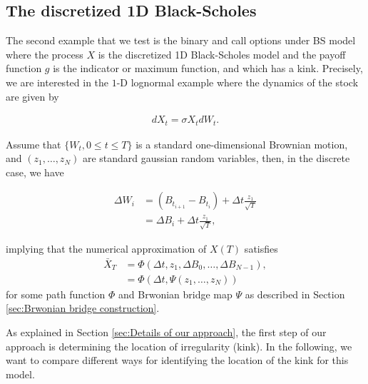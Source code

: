 \documentclass[11pt]{article}
\begin{document}
\FloatBarrier


\subsection{The discretized 1D Black-Scholes}\label{sec:The discretized 1D Black-Scholes}

The second example that we test is the binary and  call options under BS model where the process $X$ is the discretized 1D Black-Scholes model and the payoff function $g$ is the indicator or maximum function, and which has a kink. Precisely, we are interested in the  $1$-D lognormal example where the dynamics of the stock are given by

\begin{align}\label{lognormal_dynamics}
	dX_t=\sigma X_t dW_t.
\end{align}


Assume that $\{W_t, 0 \leq t \leq T\} $ is a standard one-dimensional Brownian motion, and $(z_1,\dots,z_N)$ are standard gaussian random variables, then, in the discrete case, we have

\begin{align}\label{Brownian_bridge_BS_1D}
	\Delta W_i&=(B_{t_{i+1}}-B_{t_i})+\Delta t \frac{z_1}{\sqrt{T}} \nonumber\\
	&= \Delta B_i + \Delta t \frac{z_1}{\sqrt{T}},
\end{align}

implying that the numerical approximation of $X(T)$ satisfies
\begin{align}
	\bar{X}_T&=\Phi(\Delta t, z_1, \Delta B_0,\dots,\Delta B_{N-1}), \\ \nonumber
	&=\Phi(\Delta t, \Psi(z_1,\dots,z_N))
\end{align}
for some path function $\Phi$ and Brwonian bridge map $\Psi$ as described in Section \ref{sec:Brwonian bridge construction}.




As explained in Section \ref{sec:Details of our approach}, the first step of our approach is determining the location of irregularity (kink). In the following, we want to compare different ways for identifying the location of the kink for this model.
\end{document}
